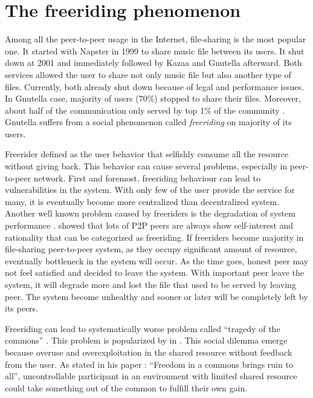 \section{The freeriding phenomenon}
Among all the peer-to-peer usage in the Internet, file-sharing is the most popular one. It started with Napster in 1999 to share music file between its users. It shut down at 2001 and immediately followed by Kazaa and Gnutella afterward. Both services allowed the user to share not only music file but also another type of files. Currently, both already shut down because of legal and performance issues. In Gnutella case, majority of users (70\%) stopped to share their files. Moreover, about half of the communication only served by top 1\% of the community \cite{2000:freeridegnutella:adar}. Gnutella suffers from a social phenomenon called \textit{freeriding} on majority of its users.

Freerider defined as the user behavior that selfishly consume all the resource without giving back. This behavior can cause several problems, especially in peer-to-peer network. First and foremost, freeriding behaviour can lead to vulnerabilities in the system. With only few of the user provide the service for many, it is eventually become more centralized than decentralized system. Another well known problem caused by freeriders is the degradation of system performance \cite{2000:freeridegnutella:adar}. \citeauthor{2000:freeridegnutella:adar} showed that lots of P2P peers are always show self-interest and rationality that can be categorized as freeriding. If freeriders become majority in file-sharing peer-to-peer system, as they occupy significant amount of resource, eventually bottleneck in the system will occur. As the time goes, honest peer may not feel satisfied and decided to leave the system. With important peer leave the system, it will degrade more and lost the file that used to be served by leaving peer. The system become unhealthy and sooner or later will be completely left by its peers.

Freeriding can lead to systematically worse problem called ``tragedy of the commons'' \cite{1968:tragedycommon:hardin}. This problem is popularized by \citet*{1968:tragedycommon:hardin} in \citeyear{1968:tragedycommon:hardin}. This social dilemma emerge because overuse and overexploitation in the shared resource without feedback from the user. As \citeauthor{1968:tragedycommon:hardin} stated in his paper : ``Freedom in a commons brings ruin to all'', uncontrollable participant in an environment with limited shared resource could take something out of the common to fulfill their own gain.


